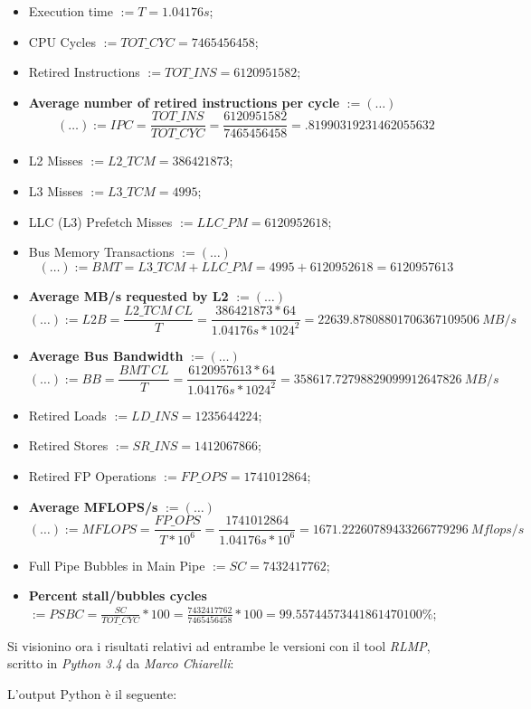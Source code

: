 \begin{itemize}
\begin{itemize}
\item{Execution time} $:= T = 1.04176s$;
\item{CPU Cycles} $:= TOT\_CYC = 7465456458$;
\item{Retired Instructions} $:= TOT\_INS = 6120951582$;
\item{\textbf{Average number of retired instructions per cycle}} $:= (\dots)$
\[
	(\dots) := IPC = \frac{TOT\_INS}{TOT\_CYC} = \frac{6120951582}{7465456458} = .81990319231462055632
\]
\item{L2 Misses} $:= L2\_TCM = 386421873$;
\item{L3 Misses} $:= L3\_TCM = 4995$;
\item{LLC (L3) Prefetch Misses} $:= LLC\_PM = 6120952618$;
\item{Bus Memory Transactions} $:= (\dots)$
\[
	(\dots) := BMT = L3\_TCM+LLC\_PM = 4995+6120952618 = 6120957613
\]
\item{\textbf{Average MB/s requested by L2}} $:= (\dots)$
\[
	(\dots) := L2B = \frac{L2\_TCM\ CL}{T} = \frac{386421873*64}{1.04176s*1024^2} = 22639.87808801706367109506\ MB/s
\]
\item{\textbf{Average Bus Bandwidth}} $:= (\dots)$
\[
	(\dots) := BB = \frac{BMT\ CL}{T} = \frac{6120957613*64}{1.04176s*1024^2} = 358617.72798829099912647826\ MB/s
\]
\item{Retired Loads} $:= LD\_INS = 1235644224$;
\item{Retired Stores} $:= SR\_INS = 1412067866$;
\item{Retired FP Operations} $:= FP\_OPS = 1741012864$;
\item{\textbf{Average MFLOPS/s}} $:= (\dots)$
\[
	(\dots) := MFLOPS = \frac{FP\_OPS}{T*10^6} = \frac{1741012864}{1.04176s*10^6} = 1671.22260789433266779296\ Mflops/s
\]
\item{Full Pipe Bubbles in Main Pipe} $:= SC = 7432417762$;
\item{\textbf{Percent stall/bubbles cycles}} $:= PSBC = \frac{SC}{TOT\_CYC}*100 = \frac{7432417762}{7465456458}*100 = 99.55744573441861470100\%$;
\end{itemize}

\end{itemize}

Si visionino ora i risultati relativi ad entrambe le versioni con il tool \emph{RLMP}, scritto in \emph{Python 3.4} da \emph{Marco Chiarelli}:

L'output Python è il seguente:


